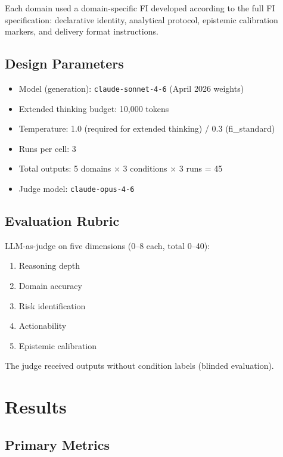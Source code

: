 \documentclass[11pt,a4paper]{article}
\begin{document}
Each domain used a domain-specific FI developed according to the full FI
specification: declarative identity, analytical protocol, epistemic calibration
markers, and delivery format instructions.

\subsection{Design Parameters}

\begin{itemize}
  \item Model (generation): \texttt{claude-sonnet-4-6} (April 2026 weights)
  \item Extended thinking budget: 10,000 tokens
  \item Temperature: 1.0 (required for extended thinking) / 0.3 (fi\_standard)
  \item Runs per cell: 3
  \item Total outputs: 5 domains $\times$ 3 conditions $\times$ 3 runs = 45
  \item Judge model: \texttt{claude-opus-4-6}
\end{itemize}

\subsection{Evaluation Rubric}

LLM-as-judge on five dimensions (0–8 each, total 0–40):
\begin{enumerate}
  \item Reasoning depth
  \item Domain accuracy
  \item Risk identification
  \item Actionability
  \item Epistemic calibration
\end{enumerate}

The judge received outputs without condition labels (blinded evaluation).

\section{Results}

\subsection{Primary Metrics}
\end{document}
